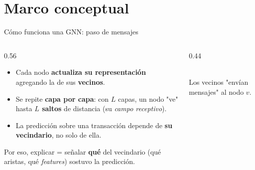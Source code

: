 \documentclass[aspectratio=169,11pt]{beamer}
\begin{document}
\section{Marco conceptual}

\begin{frame}{Cómo funciona una GNN: paso de mensajes}
\begin{columns}[T]
\begin{column}{0.56\textwidth}
\begin{itemize}
  \item Cada nodo \textbf{actualiza su representación} agregando la de sus \textbf{vecinos}.
  \item Se repite \textbf{capa por capa}: con $L$ capas, un nodo "ve" hasta \textbf{$L$ saltos} de distancia (su \emph{campo receptivo}).
  \item La predicción sobre una transacción depende de \textbf{su vecindario}, no solo de ella.
\end{itemize}
\vspace{0.2em}
\begin{block}{Por eso, explicar =}
señalar \textbf{qué} del vecindario (qué aristas, qué \emph{features}) sostuvo la predicción.
\end{block}
\end{column}
\begin{column}{0.44\textwidth}\centering
{}
\\[4pt]
{\scriptsize\color{muted} Los vecinos "envían mensajes" al nodo $v$.}
\end{column}
\end{columns}
\end{frame}
\end{document}
